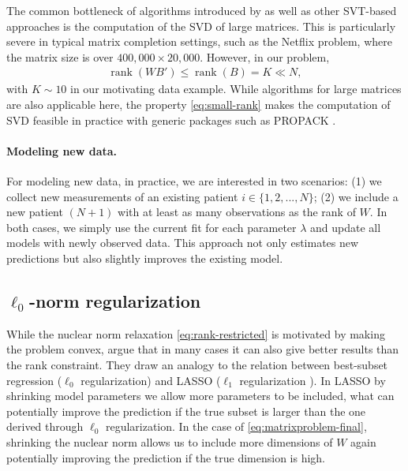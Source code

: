 \documentclass[preprint]{imsart}
\numberwithin{equation}{section}
\theoremstyle{plain}
\newcommand{\tr}[1]{{\textcolor{red}{#1}}}
\DeclareMathOperator*{\rank}{rank}
\begin{document}
The common bottleneck of algorithms introduced by \citet{cai2010singular,mazumder2010spectral,ma2011fixed} as well as other SVT-based approaches is the computation of the SVD of large matrices. This is particularly severe in typical matrix completion settings, such as the Netflix problem, where the matrix size is over $400{,}000 \times 20{,}000$. However, in our problem,
\begin{align}\label{eq:small-rank}
  \rank(WB') \leq \rank(B) = K \ll N,
\end{align}
with $K \sim 10$ in our motivating data example. While algorithms for large matrices are also applicable here, the property \eqref{eq:small-rank} makes the computation of SVD feasible in practice with generic packages such as PROPACK \citep{larsen2004propack}.

\paragraph{Modeling new data.}

For modeling new data, in practice, we are interested in two scenarios: (1) we collect new measurements of an existing patient $i \in \{1,2,...,N\}$; (2) we include a new patient $(N+1)$ with at least as many observations as the rank of $W$. In both cases, we simply use the current fit for each parameter $\lambda$ and update all models with newly observed data. This approach not only estimates new predictions but also slightly improves the existing model. 




\subsection{$\ell_0$-norm regularization}

While the nuclear norm relaxation \eqref{eq:rank-restricted} is motivated by making the problem convex, \citet{mazumder2010spectral} argue that in many cases it can also give better results than the rank constraint. They draw an analogy to the relation between best-subset regression ($\ell_0$ regularization) and LASSO ($\ell_1$ regularization \citep{tibshirani1996regression, friedman2001elements}). In LASSO by shrinking model parameters we allow more parameters to be included, what can potentially improve the prediction if the true subset is larger than the one derived through $\ell_0$ regularization. In the case of \eqref{eq:matrixproblem-final}, shrinking the nuclear norm allows us to include more dimensions of $W$ again potentially improving the prediction if the true dimension is high.
\end{document}

